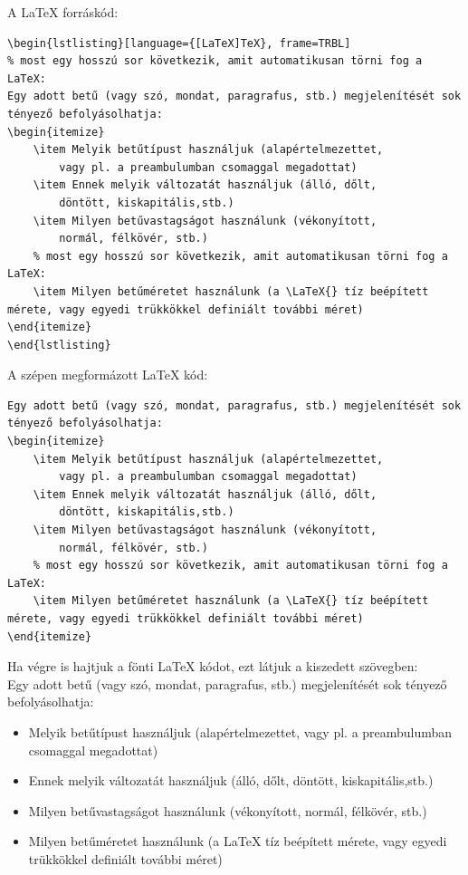 \documentclass{article}
\begin{document}
A \LaTeX{} forráskód:
{\small
\begin{verbatim}
\begin{lstlisting}[language={[LaTeX]TeX}, frame=TRBL]
% most egy hosszú sor következik, amit automatikusan törni fog a LaTeX:
Egy adott betű (vagy szó, mondat, paragrafus, stb.) megjelenítését sok tényező befolyásolhatja:
\begin{itemize}
	\item Melyik betűtípust használjuk (alapértelmezettet,
		vagy pl. a preambulumban csomaggal megadottat)
	\item Ennek melyik változatát használjuk (álló, dőlt,
		döntött, kiskapitális,stb.)
	\item Milyen betűvastagságot használunk (vékonyított,
		normál, félkövér, stb.)
	% most egy hosszú sor következik, amit automatikusan törni fog a LaTeX:
	\item Milyen betűméretet használunk (a \LaTeX{} tíz beépített mérete, vagy egyedi trükkökkel definiált további méret)
\end{itemize}
\end{lstlisting}
\end{verbatim}
}
  A szépen megformázott \LaTeX{} kód:
\begin{lstlisting}[language={[LaTeX]TeX}, frame=TRBL]
% most egy hosszú sor következik, amit automatikusan törni fog a LaTeX:
Egy adott betű (vagy szó, mondat, paragrafus, stb.) megjelenítését sok tényező befolyásolhatja:
\begin{itemize}
	\item Melyik betűtípust használjuk (alapértelmezettet,
		vagy pl. a preambulumban csomaggal megadottat)
	\item Ennek melyik változatát használjuk (álló, dőlt,
		döntött, kiskapitális,stb.)
	\item Milyen betűvastagságot használunk (vékonyított,
		normál, félkövér, stb.)
	% most egy hosszú sor következik, amit automatikusan törni fog a LaTeX:
	\item Milyen betűméretet használunk (a \LaTeX{} tíz beépített mérete, vagy egyedi trükkökkel definiált további méret)
\end{itemize}
\end{lstlisting}
  Ha végre is hajtjuk a fönti \LaTeX{} kódot, ezt látjuk a kiszedett szövegben:\\[1em]

Egy adott betű (vagy szó, mondat, paragrafus, stb.) megjelenítését sok tényező befolyásolhatja:
\begin{itemize}
	\item Melyik betűtípust használjuk (alapértelmezettet,
		vagy pl. a preambulumban csomaggal megadottat)
	\item Ennek melyik változatát használjuk (álló, dőlt,
		döntött, kiskapitális,stb.)
	\item Milyen betűvastagságot használunk (vékonyított,
		normál, félkövér, stb.)
	\item Milyen betűméretet használunk (a \LaTeX{} tíz beépített mérete, vagy egyedi trükkökkel definiált további méret)
\end{itemize}
\end{document}
